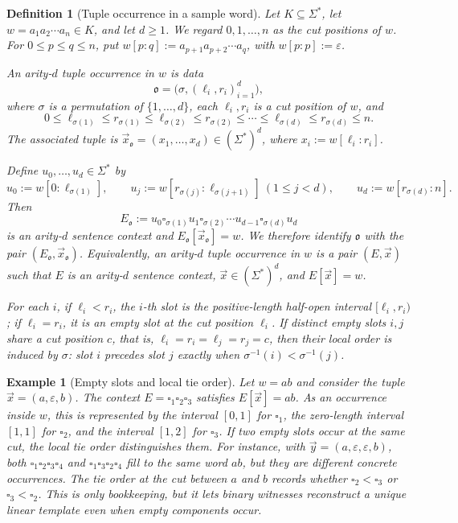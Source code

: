 \documentclass[11pt,a4paper]{article}
\newtheorem{definition}[theorem]{Definition}
\newtheorem{example}[theorem]{Example}
\theoremstyle{remark}
\newcommand{\tuple}[1]{\vec{#1}}
\newcommand{\blank}{\square}
\newcommand{\eps}{\varepsilon}
\begin{document}
\begin{definition}[Tuple occurrence in a sample word]
\label{def:tuple-occurrence}
Let \(K\subseteq\Sigma^*\), let \(w=a_1a_2\cdots a_n\in K\), and let
\(d\ge1\).  We regard \(0,1,\ldots,n\) as the cut positions of \(w\).  For
\(0\le p\le q\le n\), put
\(w[p:q]:=a_{p+1}a_{p+2}\cdots a_q\), with \(w[p:p]:=\eps\).

An \emph{arity-\(d\) tuple occurrence} in \(w\) is data
\[
  \mathfrak o=\bigl(\sigma,(\ell_i,r_i)_{i=1}^d\bigr),
\]
where \(\sigma\) is a permutation of \(\{1,\ldots,d\}\), each
\(\ell_i,r_i\) is a cut position of \(w\), and
\[
  0\le \ell_{\sigma(1)}\le r_{\sigma(1)}\le
  \ell_{\sigma(2)}\le r_{\sigma(2)}\le\cdots\le
  \ell_{\sigma(d)}\le r_{\sigma(d)}\le n.
\]
The associated tuple is
\(\tuple x_{\mathfrak o}=(x_1,\ldots,x_d)\in(\Sigma^*)^d\), where
\(x_i:=w[\ell_i:r_i]\).

Define \(u_0,\ldots,u_d\in\Sigma^*\) by
\[
  u_0:=w[0:\ell_{\sigma(1)}],\qquad
  u_j:=w[r_{\sigma(j)}:\ell_{\sigma(j+1)}]\ (1\le j<d),\qquad
  u_d:=w[r_{\sigma(d)}:n].
\]
Then
\[
  E_{\mathfrak o}:=
  u_0\blank_{\sigma(1)}u_1\blank_{\sigma(2)}\cdots
  u_{d-1}\blank_{\sigma(d)}u_d
\]
is an arity-\(d\) sentence context and
\(E_{\mathfrak o}[\tuple x_{\mathfrak o}]=w\).  We therefore identify
\(\mathfrak o\) with the pair
\((E_{\mathfrak o},\tuple x_{\mathfrak o})\).  Equivalently, an arity-\(d\)
tuple occurrence in \(w\) is a pair \((E,\tuple x)\) such that \(E\) is an
arity-\(d\) sentence context, \(\tuple x\in(\Sigma^*)^d\), and
\(E[\tuple x]=w\).

For each \(i\), if \(\ell_i<r_i\), the \(i\)-th slot is the positive-length
half-open interval \([\ell_i,r_i)\); if \(\ell_i=r_i\), it is an empty slot at
the cut position \(\ell_i\).  If distinct empty slots \(i,j\) share a cut
position \(c\), that is,
\(\ell_i=r_i=\ell_j=r_j=c\), then their local order is induced by \(\sigma\):
slot \(i\) precedes slot \(j\) exactly when
\(\sigma^{-1}(i)<\sigma^{-1}(j)\).
\end{definition}

\begin{example}[Empty slots and local tie order]
\label{ex:empty-slots}
Let \(w=ab\) and consider the tuple \(\tuple x=(a,\eps,b)\).  The context
\(E=\blank_1\blank_2\blank_3\) satisfies \(E[\tuple x]=ab\).  As an occurrence
inside \(w\), this is represented by the interval \([0,1]\) for
\(\blank_1\), the zero-length interval \([1,1]\) for \(\blank_2\), and the
interval \([1,2]\) for \(\blank_3\).  If two empty slots occur at the same cut,
the local tie order distinguishes them.  For instance, with
\(\tuple y=(a,\eps,\eps,b)\), both
\(\blank_1\blank_2\blank_3\blank_4\) and
\(\blank_1\blank_3\blank_2\blank_4\) fill to the same word \(ab\), but they are
different concrete occurrences.  The tie order at the cut between \(a\) and
\(b\) records whether \(\blank_2<\blank_3\) or \(\blank_3<\blank_2\).  This is
only bookkeeping, but it lets binary witnesses reconstruct a unique linear
template even when empty components occur.
\end{example}
\end{document}
